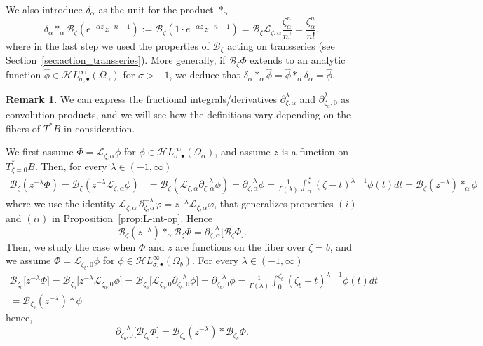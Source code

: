 \documentclass{article}
\newcommand{\singexp}[2]{\mathcal{H}L^\infty_{#1, #2}}
\newcommand{\singexpalg}[1]{\singexp{#1}{\bullet}}
\newcommand{\series}[1]{\tilde{#1}}
\newcommand{\fracderiv}[3]{\partial^{#1}_{#2, #3}}
\newcommand{\laplace}{\mathcal{L}}
\newcommand{\borel}{\mathcal{B}}
\theoremstyle{definition}
\newtheorem{remark}[definition]{Remark}
\theoremstyle{plain}
\newenvironment{verify}{\color{ForestGreen}}{\color{black}}
\begin{document}
\begin{verify}
We also introduce $\delta_\alpha$ as the unit for the product $\ast_\alpha$
\[\delta_\alpha\ast_\alpha\borel_\zeta(e^{-\alpha z}z^{-n-1}):=\borel_\zeta(1\cdot e^{-\alpha z} z^{-n-1})=\borel_\zeta\laplace_{\zeta,\alpha}\frac{\zeta_\alpha^n}{n!}=\frac{\zeta_\alpha^n}{n!},\]
where in the last step we used the properties of $\borel_\zeta$ acting on transseries (see Section~\ref{sec:action_transseries}).
More generally, if $\borel_\zeta\series{\Phi}$ extends to an analytic function $\hat{\phi}\in\singexpalg{\sigma}(\Omega_\alpha)$ for $\sigma>-1$, we deduce that $\delta_\alpha\ast_\alpha\hat{\phi}=\hat{\phi}\ast_\alpha\delta_\alpha=\hat{\phi}$. 
\begin{remark}
We can express the fractional integrals/derivatives $\fracderiv{\lambda}{\zeta}{\alpha}$ and $\fracderiv{\lambda}{\zeta_\alpha}{0}$ as convolution products, and we will see how the definitions vary depending on the fibers of $T^*B$ in consideration. 

We first assume $\Phi=\laplace_{\zeta,\alpha}\phi$ for $\phi\in\singexpalg{\sigma}(\Omega_\alpha)$, and assume $z$ is a function on $T^*_{\zeta=0}B$. Then, for every $\lambda\in (-1,\infty)$
\begin{align*}
    \borel_\zeta(z^{-\lambda}{\Phi})=\borel_\zeta(z^{-\lambda}\laplace_{\zeta,\alpha}\phi)&=\borel_\zeta(\laplace_{\zeta,\alpha}\partial_{\zeta,\alpha}^{-\lambda}\phi)=\partial_{\zeta,\alpha}^{-\lambda}\phi=\frac{1}{\Gamma(\lambda)}\int_{\alpha}^\zeta (\zeta-t)^{\lambda-1}\phi(t)dt=\borel_\zeta (z^{-\lambda})\ast_\alpha\phi
\end{align*}
where we use the identity $\laplace_{\zeta, \alpha}\,\fracderiv{-\lambda}{\zeta}{\alpha} \varphi = z^{-\lambda} \laplace_{\zeta, \alpha} \varphi$, that generalizes properties $(i)$ and $(ii)$ in Proposition~\ref{prop:L-int-op}. Hence \[\borel_\zeta (z^{-\lambda})\ast_\alpha\borel_\zeta{\Phi}=\fracderiv{-\lambda}{\zeta}{\alpha}\big[\borel_\zeta\Phi\big].\]
Then, we study the case when $\Phi$ and $z$ are functions on the fiber over $\zeta=b$, and we assume $\Phi=\laplace_{\zeta_b,0}\phi$ for $\phi\in\singexpalg{\sigma}(\Omega_b)$. For every $\lambda\in (-1,\infty)$
\begin{multline*}
    \borel_{\zeta_b}\big[z^{-\lambda}\Phi\big]=\borel_{\zeta_b}\big[z^{-\lambda}\laplace_{\zeta_b,0}\phi\big]=\borel_{\zeta_b}\big[\laplace_{\zeta_b,0}\partial_{\zeta_b,0}^{-\lambda}\phi\big]=\partial_{\zeta_b,0}^{-\lambda}\phi=\frac{1}{\Gamma(\lambda)}\int_{0}^{\zeta_b} (\zeta_b-t)^{\lambda-1}\phi(t)dt\\
    =\borel_{\zeta_b}(z^{-\lambda})\ast\phi
\end{multline*}
hence,  \[\partial_{\zeta_b,0}^{-\lambda}\big[\borel_{\zeta_b}\Phi\big]=\borel_{\zeta_b} (z^{-\lambda})\ast\borel_{\zeta_b}{\Phi}.\]
\end{remark}
\end{verify}
%
\end{document}
